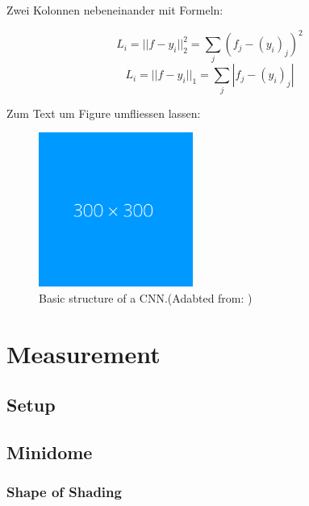 \documentclass[a4paper,twoside,11pt,openright,table,draft]{article} %
\begin{document}
\newpage

Zwei Kolonnen nebeneinander mit Formeln:
\begin{multicols}{2}
\begin{equation} \label{eq:l2loss}
	L_{i} = || f - y_{i} ||^{2}_{2} = \sum\limits_{j} ( f_{j} -(y_{i})_{j})^{2}
\end{equation} \break
\begin{equation} \label{eq:l1loss}
	L_{i} = || f - y_{i} ||_{1} = \sum\limits_{j} | f_{j}-(y_{i})_{j}|
\end{equation}
\end{multicols}

\FloatBarrier

Zum Text um Figure umfliessen lassen:\\
\begin{figure}
	\centering
	\includegraphics[width=0.45\textwidth]{fig/dummy.png}
	\caption[Basic structure of a CNN]{\label{fig:overview_cnn}Basic structure of a CNN.(Adabted from: \textcite{chollet2017})}
\end{figure}

\lipsum[1-2]
\cleardoublepage

\section{Measurement}
\label{sec:second_section}
\lipsum[2]
\subsection{Setup}
\lipsum[2]
\subsection{Minidome}
\lipsum[7]
\subsubsection{Shape of Shading}
\lipsum[8]
\end{document}
